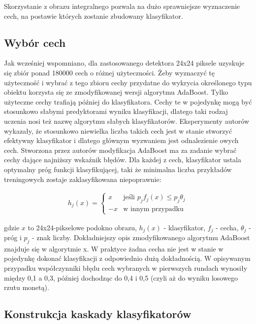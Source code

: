 \documentclass[12pt,a4paper,leqno,oneside,titlepage]{book}
\begin{document}
Skorzystanie z obrazu integralnego pozwala na dużo sprawniejsze wyznaczenie cech, na postawie których zostanie zbudowany klasyfikator.

\subsection{Wybór cech}

Jak wcześniej wspomniano, dla zastosowanego detektora 24x24 piksele uzyskuje się zbiór ponad 180000 cech o różnej użyteczności. Żeby wyznaczyć tę użyteczność i wybrać z tego zbioru cechy przydatne do wykrycia określonego typu obiektu korzysta się ze zmodyfikowanej wersji algorytmu AdaBoost. Tylko użyteczne cechy trafiają później do klasyfikatora. Cechy te w pojedynkę mogą być stosunkowo słabymi predyktorami wyniku klasyfikacji, dlatego taki rodzaj uczenia nosi też nazwę algorytmu słabych klasyfikatorów. Eksperymenty autorów wykazały, że stosunkowo niewielka liczba takich cech jest w stanie stworzyć efektywny klasyfikator i dlatego głównym wyzwaniem jest odnalezienie owych cech.
Stworzona przez autorów modyfikacja AdaBoost ma za zadanie wybrać cechy dające najniższy wskaźnik błędów. Dla każdej z cech, klasyfikator  ustala optymalny próg funkcji klasyfikującej, taki że minimalna liczba przykładów treningowych zostaje zaklasyfikowana niepoprawnie:

\begin{align}
h_{j}(x) = \left.
	\begin{cases}
		x  & \text{jeśli } p_{j}f_{j}(x) \leq p_{j}\theta_{j} \\
		-x & \text{w innym przypadku}
	\end{cases}
	\right.
\end{align}

gdzie $x$ to 24x24-pikselowe podokno obrazu, $h_{j}(x)$ - klasyfikator, $f_{j}$ - cecha, $\theta_{j}$ - próg i $p_{j}$ - znak liczby. Dokładniejszy opis zmodyfikowanego algorytmu AdaBoost znajduje się w algorytmie x. W praktyce żadna cecha nie jest w stanie w pojedynkę dokonać klasyfikacji z odpowiednio dużą dokładnością. W opisywanym przypadku współczynniki błędu cech wybranych w pierwszych rundach wynosiły między 0,1 a 0,3, później dochodząc do 0,4 i 0,5 (czyli aż do wyniku losowego rzutu monetą).\cite{ViolaJones01}

\subsection{Konstrukcja kaskady klasyfikatorów}
\end{document}
